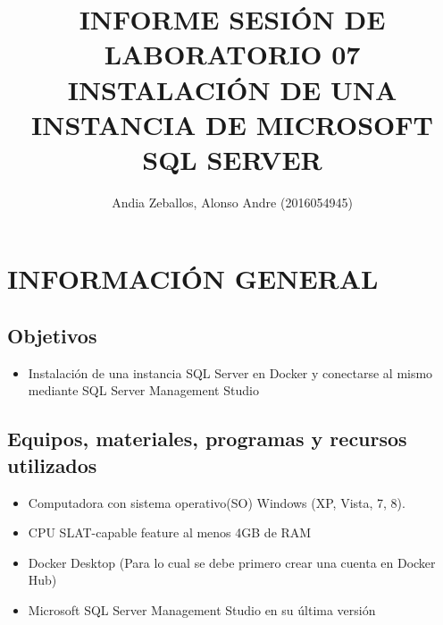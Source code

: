 \documentclass[preprint,12pt]{elsarticle}
\begin{document}
	
	\begin{frontmatter} 

		\title{\huge INFORME SESIÓN DE LABORATORIO 07 INSTALACIÓN DE UNA INSTANCIA DE MICROSOFT SQL SERVER}
		
		\author{Andia Zeballos, Alonso Andre         	(2016054945)} 
		\address{Escuela Profesional de Ingeniería de Sistemas}
		\address{Universidad Privada de Tacna}
		\address{Tacna, Perú}
		

	\end{frontmatter}


\section{INFORMACIÓN GENERAL} 

\subsection {\textbf{Objetivos}}
\begin{itemize}
	\item Instalación de una instancia SQL Server en Docker y conectarse al mismo mediante SQL Server Management Studio
\end{itemize}

\subsection {\textbf{Equipos, materiales, programas y recursos utilizados}}
\begin{itemize}
	\item Computadora con sistema operativo(SO) Windows (XP, Vista, 7, 8).
	\item CPU SLAT-capable feature al menos 4GB de RAM
	\item Docker Desktop (Para lo cual se debe primero crear una cuenta en Docker Hub)
	\item Microsoft SQL Server Management Studio en su última versión
\end{itemize}



\end{document}
